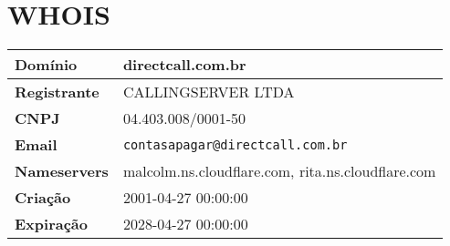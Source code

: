 
\section{WHOIS}
\begin{tabular}{|l|l|}
\hline
\textbf{Domínio} & directcall.com.br \\ \hline
\textbf{Registrante} & CALLINGSERVER LTDA \\ \hline
\textbf{CNPJ} & 04.403.008/0001-50 \\ \hline
\textbf{Email} & \texttt{contasapagar@directcall.com.br} \\ \hline
\textbf{Nameservers} & malcolm.ns.cloudflare.com, rita.ns.cloudflare.com \\ \hline
\textbf{Criação} & 2001-04-27 00:00:00 \\ \hline
\textbf{Expiração} & 2028-04-27 00:00:00 \\ \hline
\end{tabular}
